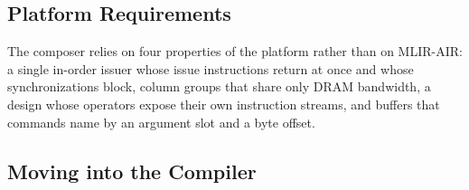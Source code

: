 \subsection{Platform Requirements}
\label{app:platform-req}

The composer relies on four properties of the platform rather than on MLIR-AIR: a single in-order issuer whose issue instructions return at once and whose synchronizations block, column groups that share only DRAM bandwidth, a design whose operators expose their own instruction streams, and buffers that commands name by an argument slot and a byte offset.

\subsection{Moving into the Compiler}
\label{app:compiler}

